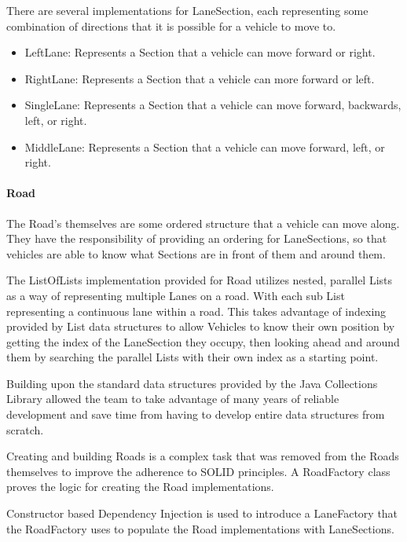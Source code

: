 \documentclass[11pt]{article}
\begin{document}
{\begin{itemize}
    There are several implementations for LaneSection, each representing some combination of directions that it is possible for a vehicle to move to.
    
    \begin{itemize}[noitemsep]
    \item LeftLane: Represents a Section that a vehicle can move forward or right.
    \item RightLane: Represents a Section that a vehicle can more forward or left.
    \item SingleLane: Represents a Section that a vehicle can move forward, backwards, left, or right.
    \item MiddleLane: Represents a Section that a vehicle can move forward, left, or right.
    \end{itemize}
    \paragraph{Road}
    
    The Road's themselves are some ordered structure that a vehicle can move along. They have the responsibility of providing an ordering for LaneSections, so that vehicles are able to know what Sections are in front of them and around them.
    
    The ListOfLists implementation provided for Road utilizes nested, parallel Lists as a way of representing multiple Lanes on a road. With each sub List representing a continuous lane within a road. This takes advantage of indexing provided by List data structures to allow Vehicles to know their own position by getting the index of the LaneSection they occupy, then looking ahead and around them by searching the parallel Lists with their own index as a starting point.
    
    Building upon the standard data structures provided by the Java Collections Library allowed the team to take advantage of many years of reliable development and save time from having to develop entire data structures from scratch.
    
    Creating and building Roads is a complex task that was removed from the Roads themselves to improve the adherence to SOLID principles. A RoadFactory class proves the logic for creating the Road implementations.
    
    Constructor based Dependency Injection is used to introduce a LaneFactory that the RoadFactory uses to populate the Road implementations with LaneSections.
    

\end{itemize}}
\end{document}
